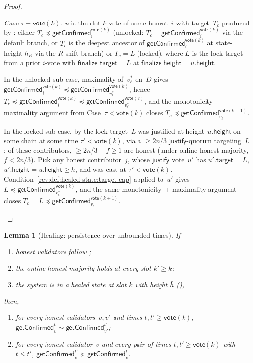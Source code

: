 \documentclass{article}
\newcommand{\target}{\mathsf{target}}
\newcommand{\height}{\mathsf{height}}
\newcommand{\just}{\ensuremath{\mathsf{justify}}\xspace}
\newcommand{\finalizeHeight}{\mathsf{finalize\_height}}
\newcommand{\finalizeTarget}{\mathsf{finalize\_target}}
\newcommand{\vote}{\mathsf{vote}}
\newcommand{\comm}[1]{\bar{#1}}
\newcommand{\getConfirmed}{\textsf{getConfirmed}\xspace}
\theoremstyle{plain}
\newtheorem{lemma}{Lemma}
\theoremstyle{definition}
\theoremstyle{remark}
\newcommand{\OHM}{online-honest majority\xspace}
\begin{document}
\begin{proof}
\begin{itemize}
  \emph{Case $\tau = \vote(k)$.}
  $u$ is the slot-$k$ vote of some honest~$i$ with target~$T_c$ produced by : either $T_c \preceq \getConfirmed_i^{\vote(k)}$ (unlocked: $T_c = \getConfirmed_i^{\vote(k)}$ via the default branch, or $T_c$ is the deepest ancestor of $\getConfirmed_i^{\vote(k)}$ at state-height $h_R$ via the $R$-shift branch) or $T_c = L$ (locked), where $L$ is the lock target from a prior $i$-vote with $\finalizeTarget = L$ at $\finalizeHeight = u.\height$.

  In the unlocked sub-case, maximality of~$v^*_\ell$ on~$D$ gives $\getConfirmed_i^{\vote(k)} \preceq \getConfirmed_{v^*_\ell}^{\vote(k)}$, hence $T_c \preceq \getConfirmed_i^{\vote(k)} \preceq \getConfirmed_{v^*_\ell}^{\vote(k)}$, and the monotonicity~+ maximality argument from Case~$\tau < \vote(k)$ closes $T_c \preceq \getConfirmed_{v_\ell}^{\vote(k+1)}$.

  In the locked sub-case, by  the lock target~$L$ was justified at height~$u.\height$ on some chain at some time $\tau' < \vote(k)$, via a $\geq 2n/3$ \just-quorum targeting~$L$; of these contributors, $\geq 2n/3 - f \geq 1$ are honest (under \OHM, $f < 2n/3$). Pick any honest contributor~$j$, whose \just vote~$u'$ has $u'.\target = L$, $u'.\height = u.\height \geq h$, and was cast at $\tau' < \vote(k)$. Condition~\ref{rev:def:healed-state:target-cap} applied to~$u'$ gives $L \preceq \getConfirmed_{v^*_\ell}^{\vote(k)}$, and the same monotonicity~+ maximality argument closes $T_c = L \preceq \getConfirmed_{v_\ell}^{\vote(k+1)}$.
\end{itemize}
\end{proof}

\begin{lemma}[Healing: persistence over unbounded times]\label{rev:lem:healing-unbounded}
If
\begin{enumerate}
  \item\label{rev:hu:f} honest validators follow ;
  \item\label{rev:hu:ohm} the \OHM holds at every slot $k' \geq k$;
  \item\label{rev:hu:hs} the system is in a healed state at slot $k$ with height $\comm{h}$ (),
\end{enumerate}
then,
\begin{enumerate}
  \item for every honest validators~$v,v'$ and times $t, t' \geq \vote(k)$, $\getConfirmed_v^{t} \sim \getConfirmed_{v'}^{t'}$;
  \item for every honest validator~$v$ and every pair of times $t, t' \geq \vote(k)$ with $t \leq t'$, $\getConfirmed_v^{t'} \succeq \getConfirmed_v^t$.
\end{enumerate}
\end{lemma}
\end{document}
